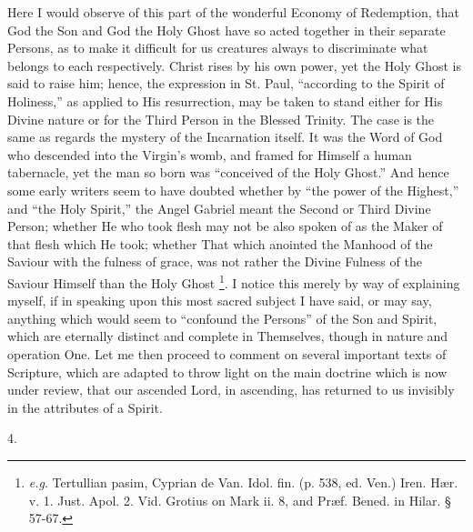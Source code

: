 Here I would observe of this part of the wonderful Economy of
Redemption, that God the Son and God the Holy Ghost have so acted
together in their separate Persons, as to make it difficult for us
creatures always to discriminate what belongs to each respectively.
Christ rises by his own power, yet the Holy Ghost is said to raise
him; hence, the expression in St. Paul, ``according to the Spirit
of Holiness,'' as applied to His resurrection, may be taken to
stand either for His Divine nature or for the Third Person in the
Blessed Trinity. The case is the same as regards the mystery of the
Incarnation itself. It was the Word of God who descended into the
Virgin's womb, and framed for Himself a human tabernacle, yet the man
so born was ``conceived of the Holy Ghost.'' And hence some
early writers seem to have doubted whether by ``the power of the
Highest,'' and ``the Holy Spirit,'' the Angel Gabriel
meant the Second or Third Divine Person; whether He who took
flesh may not be also spoken of as the Maker of that flesh which He
took; whether That which anointed the Manhood of the Saviour with the
fulness of grace, was not rather the Divine Fulness of the Saviour
Himself than the Holy Ghost \footnote{\emph{e.g}. Tertullian pasim, Cyprian de Van. Idol. fin. (p.
538, ed. Ven.) Iren. Hær. v. 1. Just. Apol. 2. Vid. Grotius on Mark
ii. 8, and Præf. Bened. in Hilar. § 57-67.}.
I notice this merely by way of explaining myself, if in speaking upon
this most sacred subject I have said, or may say, anything which would
seem to ``confound the Persons'' of the Son and Spirit, which
are eternally distinct and complete in Themselves, though in nature
and operation One. Let me then proceed to comment on several important
texts of Scripture, which are adapted to throw light on the main
doctrine which is now under review, that our ascended Lord, in
ascending, has returned to us invisibly in the attributes of a Spirit.

4.

